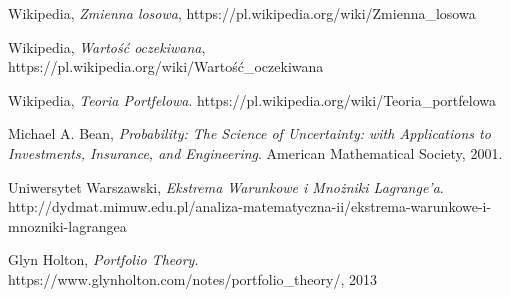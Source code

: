 \documentclass[magister]{dyplom}
\begin{document}
\begin{thebibliography}{9}
	Wikipedia,
	\emph{Zmienna losowa},
	https://pl.wikipedia.org/wiki/Zmienna\_losowa
	
	Wikipedia,
	\emph{Wartość oczekiwana},
	https://pl.wikipedia.org/wiki/Wartość\_oczekiwana
	
	Wikipedia,
	\emph{Teoria Portfelowa}.
	https://pl.wikipedia.org/wiki/Teoria\_portfelowa
	
	Michael A. Bean,
	\emph{Probability: The Science of Uncertainty: with Applications to Investments, Insurance, and Engineering}.
	American Mathematical Society, 2001.
	
	Uniwersytet Warszawski,
	\emph{Ekstrema Warunkowe i Mnożniki Lagrange'a}.
	http://dydmat.mimuw.edu.pl/analiza-matematyczna-ii/ekstrema-warunkowe-i-mnozniki-lagrangea
	
	Glyn Holton,
	\emph{Portfolio Theory}.
	https://www.glynholton.com/notes/portfolio\_theory/,
	2013
	
\end{thebibliography}
\begin{comment}
Można więc stworzyć układ równań:

$$
\left\{ \begin{array}{l}
2{\sigma_1}^2w_1 + 2\sigma_{12}w_2 - \tau(\mu_1 - r_f) = 0\\
2{\sigma_2}^2w_2 + 2\sigma_{12}w_1 - \tau(\mu_2 - r_f) = 0\\
(\mu_1 - r_f)w_1 + (\mu_2 - r_f)w_2 - \mu_p + r_f = 0
\end{array} \right.
$$

Przekształcając pierwsze dwa równania otrzymujemy:

$$
\left\{ \begin{array}{l}
{\sigma_1}^2w_1 + \sigma_{12}w_2 = \frac{\tau}{2}(\mu_1 - r_f)\\
{\sigma_2}^2w_2 + \sigma_{12}w_1 = \frac{\tau}{2}(\mu_2 - r_f)\\
(\mu_1 - r_f)w_1 + (\mu_2 - r_f)w_2 - \mu_p + r_f = 0
\end{array} \right.
$$



\begin{equation}
\left( \begin{array}{cc}
{\sigma_1}^2 & \sigma_{12}\\
\sigma_{12} & {\sigma_2}^2
\end{array} \right)
\left( \begin{array}{c}
w_1\\
w_2
\end{array} \right) =
(\frac{\tau}{2})
\left( \begin{array}{c}
\mu_1 - r_f\\
\mu_2 - r_f
\end{array} \right)
\end{equation}
\end{comment}
\end{document}
